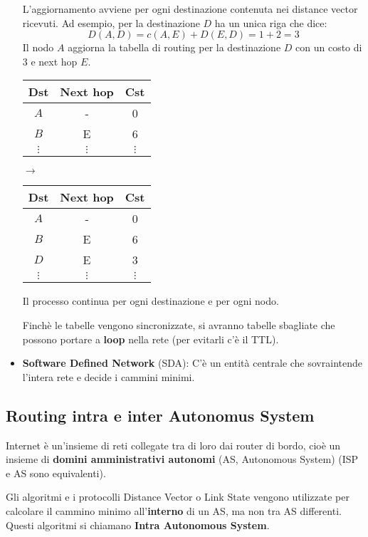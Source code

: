 \documentclass[a4paper]{article}
\begin{document}
\begin{itemize}
\begin{example}
    \noindent
    L'aggiornamento avviene per ogni destinazione contenuta nei distance vector ricevuti.
    Ad esempio, per la destinazione \( D \) ha un unica riga che dice:
    \[
      D(A,D) = c(A,E) + D(E,D) = 1 + 2 = 3
    \] 
    Il nodo \( A \) aggiorna la tabella di routing per la destinazione \( D \) con un costo
    di \( 3 \) e next hop \( E \).
    \begin{table}[H]
      \centering
      \begin{tabular}{c|c|c}
        \textbf{Dst} & \textbf{Next hop} & \textbf{Cst} \\
        \hline
        \( A \) & - & 0 \\
        \( B \) & E & 6 \\
        \( \vdots \) & \( \vdots \)  & \( \vdots \)
      \end{tabular}
      \( \to \) 
      \begin{tabular}{c|c|c}
        \textbf{Dst} & \textbf{Next hop} & \textbf{Cst} \\
        \hline
        \( A \) & - & 0 \\
        \( B \) & E & 6 \\
        \( D \) & E & 3 \\
        \( \vdots \) & \( \vdots \)  & \( \vdots \) 
      \end{tabular}
    \end{table}
    \noindent
    Il processo continua per ogni destinazione e per ogni nodo.
  \end{example}

  \noindent
  Finchè le tabelle vengono sincronizzate, si avranno tabelle sbagliate che possono
  portare a \textbf{loop} nella rete (per evitarli c'è il TTL). 

  \item \textbf{Software Defined Network} (SDA): C'è un entità centrale che sovraintende
    l'intera rete e decide i cammini minimi.
\end{itemize}

\subsection{Routing intra e inter Autonomus System}
Internet è un'insieme di reti collegate tra di loro dai router di bordo, cioè un insieme
di \textbf{domini amministrativi autonomi} (AS, Autonomous System) (ISP e AS sono
equivalenti).

\vspace{1em}
\noindent
Gli algoritmi e i protocolli Distance Vector o Link State vengono utilizzate per calcolare
il cammino minimo all'\textbf{interno} di un AS, ma non tra AS differenti. Questi 
algoritmi si chiamano \textbf{Intra Autonomous System}.
\end{document}
